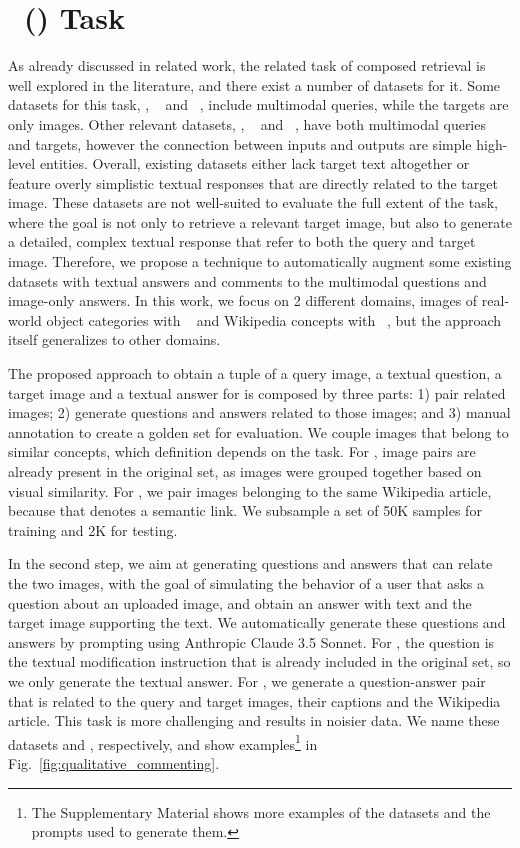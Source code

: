 \section{\tasknametitle~(\tasknameshort) Task}
\label{sec:datasets}

As already discussed in related work, the related task of composed retrieval is well explored in the literature, and there exist a number of datasets for it.
Some datasets for this task, \eg, \cirr~\cite{Liu_2021_ICCV} and \fashioniq~\cite{guo2019fashion}, include multimodal queries, while the targets are only images.
%
Other relevant datasets, \eg, \oven~\cite{hu2023open} and \infoseek~\cite{chen2023can}, have both multimodal queries and targets, however the connection between inputs and outputs are simple high-level entities.
Overall, existing datasets either lack target text altogether or feature overly simplistic textual responses that are directly related to the target image. 
These datasets are not well-suited to evaluate the full extent of the \taskname task, where the goal is not only to retrieve a relevant target image, but also to generate a detailed, complex textual response that refer to both the query and target image.
Therefore, we propose a technique to automatically augment some existing datasets with textual answers and comments to the multimodal questions and image-only answers.
In this work, we focus on 2 different domains, images of real-world object categories with \cirr~\cite{Liu_2021_ICCV} and Wikipedia concepts with \wikimm~\cite{burns2023suite}, but the approach itself generalizes to other domains.
%

%
The proposed approach to obtain a tuple of a query image, a textual question, a target image and a textual answer for \tasknameshort is composed by three parts: 
1) pair related images; 
2) generate questions and answers related to those images; and 
3) manual annotation to create a golden set for evaluation.
We couple images that belong to similar concepts, which definition depends on the task.
For \cirr, image pairs are already present in the original set, as images were grouped together based on visual similarity. %
For \wikimm, we pair images belonging to the same Wikipedia article, because that denotes a semantic link.
We subsample a set of 50K samples for training and 2K for testing.

In the second step, we aim at generating questions and answers that can relate the two images, with the goal of simulating the behavior of a user that asks a question about an uploaded image, and obtain an answer with text and the target image supporting the text.
We automatically generate these questions and answers by prompting using Anthropic Claude 3.5 Sonnet.
For \cirr, the question is the textual modification instruction that is already included in the original set, so we only generate the textual answer.
For \wikimm, we generate a question-answer pair that is related to the query and target images, their captions and the Wikipedia article.
This task is more challenging and results in noisier data.
We name these datasets \cirrcomment and \wikicomment, respectively, and show examples\footnote{The Supplementary Material shows more examples of the datasets and the prompts used to generate them.} in Fig.~\ref{fig:qualitative_commenting}.

